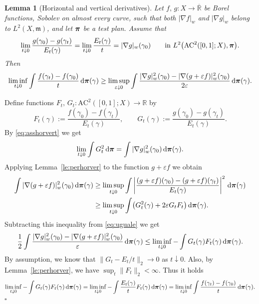 \documentclass[reqno,11pt]{article}
\numberwithin{equation}{section}
\newcommand{\R}{\mathbb{R}}
\newcommand{\mm}{{\mbox{\boldmath$m$}}}
\newcommand{\ppi}{{\mbox{\boldmath$\pi$}}}
\renewcommand{\d}{{\mathrm d}}
\newcommand{\eps}{\varepsilon}
\newenvironment{proof}{\removelastskip\par\medskip   %
\noindent{\em Proof.}
\rm}{\penalty-20\null\hfill$\square$\par\medbreak}
\newtheorem{lemma}[theorem]{Lemma}
\newcommand{\weakgrad}[1]{|\nabla #1|_w}                %
\newcommand{\AC}[3]{\mathrm{AC}^{#1}(#2;#3)}
\renewcommand{\mm}{\mathfrak m}
\begin{document}
\begin{lemma}[Horizontal and vertical derivatives]\label{le:horver}
Let $f,\,g:X\to\overline{\R}$ be Borel functions, Sobolev on almost
every curve, such that both $\weakgrad f$ and $\weakgrad g$ belong
to $L^2(X,\mm)$, and let $\ppi$ be a test plan. Assume that
\begin{equation}
\label{eq:asshorvert}
\lim_{t\downarrow0}\frac{g(\gamma_0)-g(\gamma_t)}{E_t(\gamma)}=\lim_{t\downarrow0}\frac{E_t(\gamma)}t=\weakgrad
g(\gamma_0)\qquad\text{in $L^2\bigl(\AC2{[0,1]}X ,\ppi\bigr)$.}
\end{equation}
Then
\begin{equation}\label{eq:derhorvert}
\liminf_{t\downarrow0}\int\frac{f(\gamma_{t})-f(\gamma_0)}{t}
\,\d\ppi(\gamma)\geq\limsup_{\eps\downarrow 0}\int\frac{\weakgrad
g^2(\gamma_0)-\weakgrad{(g+\eps
f)}^2(\gamma_0)}{2\eps}\,\d\ppi(\gamma).
\end{equation}
\end{lemma}
\begin{proof}
Define functions $F_t,\,G_t:\AC2{[0,1]}X \to\R$ by
\[
F_t(\gamma):=\frac{f(\gamma_0)-f(\gamma_t)}{E_t(\gamma)},\qquad
G_t(\gamma):=\frac{g(\gamma_0)-g(\gamma_t)}{E_t(\gamma)}.
\]
By \eqref{eq:asshorvert} we get
\begin{equation}
\label{eq:uguale} \lim_{t\downarrow 0}\int
G_t^2\,\d\ppi=\int\weakgrad g^2(\gamma_0)\,\d\ppi(\gamma).
\end{equation}
Applying Lemma~\ref{le:perhorver} to the function $g+\eps f$ we
obtain
\begin{equation}
\label{eq:loscambio}
\begin{split}
\int\weakgrad{(g+\eps f)}^2(\gamma_0)\,\d\ppi(\gamma)&\geq
\limsup_{t\downarrow 0}\int\left|\frac{(g+\eps f)(\gamma_0)-(g+\eps f)(\gamma_{t})}
{E_t(\gamma)}\right|^2\,\d\ppi(\gamma)\\
&\geq \limsup_{t\downarrow 0}\int \bigl(G_t^2(\gamma)+2\eps
G_tF_t\bigr) \,\d\ppi(\gamma).
\end{split}
\end{equation}
Subtracting this inequality from \eqref{eq:uguale} we get
\[
\frac12\int\frac{\weakgrad g^2(\gamma_0)-\weakgrad{(g+\eps
f)}^2(\gamma_0)}\eps  \,\d\ppi(\gamma)\leq\liminf_{t\downarrow
0}-\int G_t(\gamma)F_t(\gamma)\,\d\ppi(\gamma).
\]
By assumption, we know that $\|G_t-E_t/t\|_2\to 0$ as
$t\downarrow0$. Also, by Lemma~\ref{le:perhorver}, we have
$\sup_t\|F_t\|_2<\infty$. Thus it holds
\[
\liminf_{t\downarrow 0}-\int
G_t(\gamma)F_t(\gamma)\,\d\ppi(\gamma)=\liminf_{t\downarrow
0}-\int\frac{E_t(\gamma)}tF_t(\gamma)\,\d\ppi(\gamma)=\liminf_{t\downarrow
0}\int\frac{f(\gamma_t)-f(\gamma_0)}{t}\,\d\ppi(\gamma).
\]
\end{proof}
\end{document}
